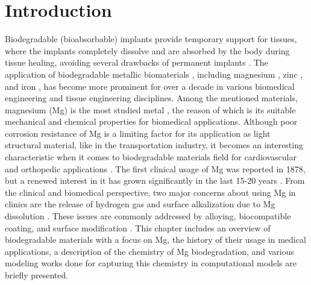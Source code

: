 \chapter{Introduction}\label{ch:introduction}


Biodegradable (bioabsorbable) implants provide temporary support for tissues, where the implants completely dissolve and are absorbed by the body during tissue healing, avoiding several drawbacks of permanent implants \cite{Gao2022}. The application of biodegradable metallic biomaterials \cite{Zheng2014, Liu2019, Han2019}, including magnesium \cite{Zhao2017,Zhen2013,Willumeit-Roemer2019}, zinc \cite{Venezuela2019,Mostaed2018}, and iron \cite{Schinhammer2010}, has become more prominent for over a decade in various biomedical engineering and tissue engineering disciplines. Among the mentioned materials, magnesium (Mg) is the most studied metal \cite{Esmaily2017}, the reason of which is its suitable mechanical and chemical properties for biomedical applications. Although poor corrosion resistance of Mg is a limiting factor for its application as light structural material, like in the transportation industry, it becomes an interesting characteristic when it comes to biodegradable materials field for cardiovascular and orthopedic applications \cite{Heublein2003,Staiger2006,Walker2014}. The first clinical usage of Mg was reported in 1878, but a renewed interest in it has grown significantly in the last 15-20 years \cite{Esmaily2017}. From the clinical and biomedical perspective, two major concerns about using Mg in clinics are the release of hydrogen gas and surface alkalization due to Mg dissolution \cite{Cecchinato2015}. These issues are commonly addressed by alloying, biocompatible coating, and surface modification \cite{Esmaily2017}. This chapter includes an overview of biodegradable materials with a focus on Mg, the history of their usage in medical applications, a description of the chemistry of Mg biodegradation, and various modeling works done for capturing this chemistry in computational models are briefly presented.

